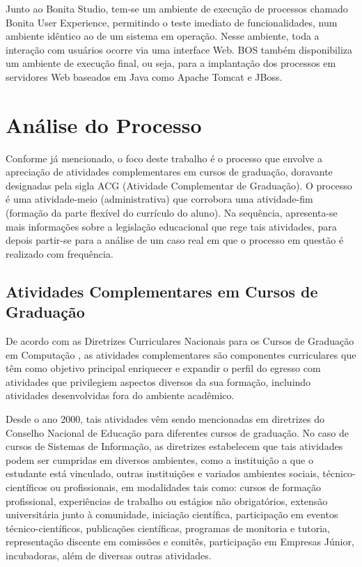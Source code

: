 \documentclass[12pt]{article}
\begin{document}
Junto ao Bonita Studio, tem-se um ambiente de execução de processos chamado Bonita User Experience, permitindo o teste imediato de funcionalidades, num ambiente idêntico ao de um sistema em operação. Nesse ambiente, toda a interação com usuários ocorre via uma interface Web. BOS também disponibiliza um ambiente de execução final, ou seja, para a implantação dos processos em servidores Web baseados em Java como Apache Tomcat e JBoss.

\section{Análise do Processo}\label{s:analise}

Conforme já mencionado, o foco deste trabalho é o processo que envolve a apreciação de atividades complementares em cursos de graduação, doravante designadas pela sigla ACG (Atividade Complementar de Graduação). O processo é uma atividade-meio (administrativa) que corrobora uma atividade-fim (formação da parte flexível do currículo do aluno). Na sequência, apresenta-se mais informações sobre a legislação educacional que rege tais atividades, para depois partir-se para a análise de um caso real em que o processo em questão é realizado com frequência.

\subsection{Atividades Complementares em Cursos de Graduação}

De acordo com as Diretrizes Curriculares Nacionais para os Cursos de Graduação em Computação \cite{parecer:136}, as atividades complementares são componentes curriculares que têm como objetivo principal enriquecer e expandir o perfil do egresso com atividades que privilegiem aspectos diversos da sua formação, incluindo atividades desenvolvidas fora do ambiente acadêmico.

Desde o ano 2000, tais atividades vêm sendo mencionadas em diretrizes do Conselho Nacional de Educação para diferentes cursos de graduação. No caso de cursos de Sistemas de Informação, as diretrizes estabelecem que tais atividades podem ser cumpridas em diversos ambientes, como a instituição a que o estudante está vinculado, outras instituições e variados ambientes sociais, técnico-científicos ou profissionais, em modalidades tais como: cursos de formação profissional, experiências de trabalho ou estágios não obrigatórios, extensão universitária junto à comunidade, iniciação científica, participação em eventos técnico-científicos, publicações científicas, programas de monitoria e tutoria, representação discente em comissões e comitês, participação em Empresas Júnior, incubadoras, além de diversas outras atividades.
\end{document}
